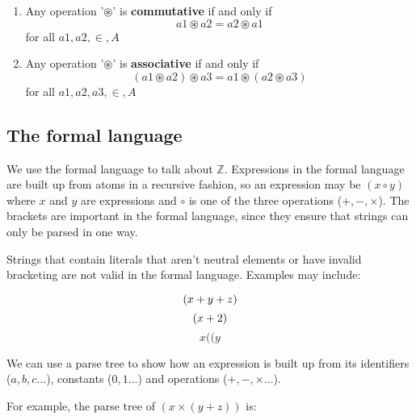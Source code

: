 \begin{enumerate}
  \item 
    Any operation '$\circledast$' is {\bf commutative} if and only if
    \begin{dmath*}
	a1 \circledast a2 = a2 \circledast a1
    \end{dmath*} 
    for all $a1,a2,\in,A$
  \item 
    Any operation '$\circledast$' is {\bf associative} if and only if
    \begin{dmath*}
	(a1 \circledast a2) \circledast a3 = a1 \circledast (a2 \circledast a3)
    \end{dmath*} 
    for all $a1,a2,a3,\in,A$
\end{enumerate}


\subsection{The formal language}

We use the formal language to talk about $\mathbb{Z}$. Expressions in the formal
language are built up from atoms in a recursive fashion, so an expression may be
$(x \circ y)$ where $x$ and $y$ are expressions and $\circ$ is one of the three
operations ($+, -, \times$). The brackets are important in the formal language,
since they ensure that strings can only be parsed in one way.

Strings that contain literals that aren't neutral elements or have invalid
bracketing are not valid in the formal language. Examples may include:

\begin{dmath*}
	(x + y + z)\\
\end{dmath*}
\begin{dmath*}
	(x + 2)\\
\end{dmath*}
\begin{dmath*}
	x((y
\end{dmath*}

We can use a parse tree to show how an expression is built up from its
identifiers ($a, b, c\ldots$), constants ($0, 1\ldots$) and operations ($+, -,
\times\ldots$).

For example, the parse tree of $(x \times (y + z))$ is:

